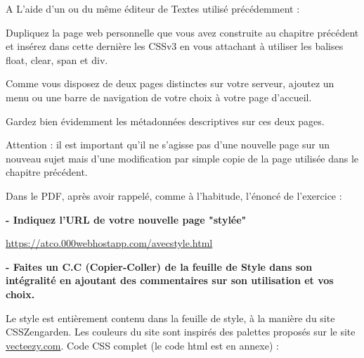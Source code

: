 \documentclass[11pt]{article}
\begin{document}
	A L’aide d’un ou du même éditeur de Textes utilisé précédemment :

	Dupliquez la page web personnelle que vous avez construite au chapitre précédent et insérez dans cette dernière les CSSv3 en vous attachant à utiliser les balises float, clear, span et div. 
	
Comme vous disposez de deux pages distinctes sur votre serveur, ajoutez un menu ou une barre de navigation de votre choix à votre page d’accueil.

Gardez bien évidemment les métadonnées descriptives sur ces deux pages.

Attention : il est important qu’il ne s’agisse pas d’une nouvelle page sur un nouveau sujet mais d’une modification par simple copie de la page utilisée dans le chapitre précédent.

Dans le PDF, après avoir rappelé, comme à l’habitude, l’énoncé de l’exercice :

\textbf{- Indiquez l’URL de votre nouvelle page "stylée"}

\url{https://atco.000webhostapp.com/avecstyle.html}

\textbf{- Faites un C.C (Copier-Coller) de la feuille de Style dans son intégralité en ajoutant des commentaires sur son utilisation et vos choix.}
	
\medskip

Le style est entièrement contenu dans la feuille de style, à la manière du site CSSZengarden. Les couleurs du site sont inspirés des palettes proposés sur le site \href{https://static.vecteezy.com/system/resources/previews/000/641/263/original/website-color-palette-ideas-vector.jpg}{vecteezy.com}. Code CSS complet (le code html est en annexe) :
\end{document}
